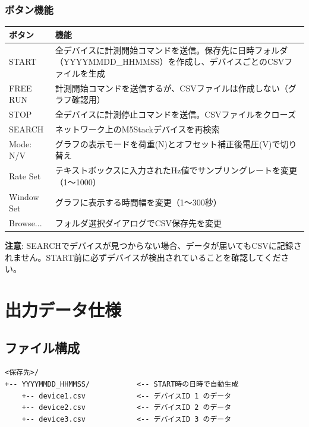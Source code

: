 \documentclass[a4paper,10pt]{ltjsarticle}
\begin{document}
\subsubsection{ボタン機能}

\begin{table}[h]
\centering
\begin{tabular}{lp{10cm}}
\toprule
\textbf{ボタン} & \textbf{機能} \\
\midrule
START     & 全デバイスに計測開始コマンドを送信。保存先に日時フォルダ（YYYYMMDD\_HHMMSS）を作成し、デバイスごとのCSVファイルを生成 \\
FREE RUN  & 計測開始コマンドを送信するが、CSVファイルは作成しない（グラフ確認用） \\
STOP      & 全デバイスに計測停止コマンドを送信。CSVファイルをクローズ \\
SEARCH    & ネットワーク上のM5Stackデバイスを再検索 \\
Mode: N/V & グラフの表示モードを荷重(N)とオフセット補正後電圧(V)で切り替え \\
Rate Set  & テキストボックスに入力されたHz値でサンプリングレートを変更（1〜1000） \\
Window Set & グラフに表示する時間幅を変更（1〜300秒） \\
Browse... & フォルダ選択ダイアログでCSV保存先を変更 \\
\bottomrule
\end{tabular}
\end{table}

\textbf{注意}: SEARCHでデバイスが見つからない場合、データが届いてもCSVに記録されません。START前に必ずデバイスが検出されていることを確認してください。

\newpage

\section{出力データ仕様}

\subsection{ファイル構成}

\begin{lstlisting}
<保存先>/
+-- YYYYMMDD_HHMMSS/           <-- START時の日時で自動生成
    +-- device1.csv            <-- デバイスID 1 のデータ
    +-- device2.csv            <-- デバイスID 2 のデータ
    +-- device3.csv            <-- デバイスID 3 のデータ
\end{lstlisting}
\end{document}
